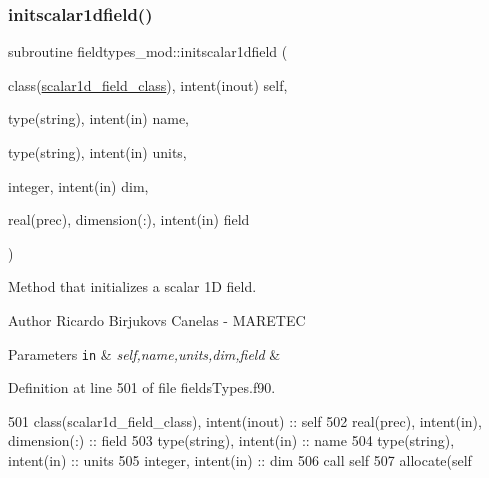 \subsubsection{\texorpdfstring{initscalar1dfield()}{initscalar1dfield()}}
{\footnotesize\ttfamily subroutine fieldtypes\+\_\+mod\+::initscalar1dfield (\begin{DoxyParamCaption}\item[{class(\mbox{\hyperlink{structfieldtypes__mod_1_1scalar1d__field__class}{scalar1d\+\_\+field\+\_\+class}}), intent(inout)}]{self,  }\item[{type(string), intent(in)}]{name,  }\item[{type(string), intent(in)}]{units,  }\item[{integer, intent(in)}]{dim,  }\item[{real(prec), dimension(\+:), intent(in)}]{field }\end{DoxyParamCaption})\hspace{0.3cm}{\ttfamily [private]}}



Method that initializes a scalar 1D field. 

\begin{DoxyAuthor}{Author}
Ricardo Birjukovs Canelas -\/ M\+A\+R\+E\+T\+EC 
\end{DoxyAuthor}

\begin{DoxyParams}[1]{Parameters}
\mbox{\tt in}  & {\em self,name,units,dim,field} & \\
\hline
\end{DoxyParams}


Definition at line 501 of file fields\+Types.\+f90.


\begin{DoxyCode}
501     \textcolor{keywordtype}{class}(scalar1d\_field\_class), \textcolor{keywordtype}{intent(inout)} :: self
502     \textcolor{keywordtype}{real(prec)}, \textcolor{keywordtype}{intent(in)}, \textcolor{keywordtype}{dimension(:)} :: field
503     \textcolor{keywordtype}{type}(string), \textcolor{keywordtype}{intent(in)} :: name
504     \textcolor{keywordtype}{type}(string), \textcolor{keywordtype}{intent(in)} :: units
505     \textcolor{keywordtype}{integer}, \textcolor{keywordtype}{intent(in)} :: dim
506     \textcolor{keyword}{call }self%
507     \textcolor{keyword}{allocate}(self%
\end{DoxyCode}
\mbox{\label{namespacefieldtypes__mod_a1a3160727c99017639d758aad9031df5}} 

